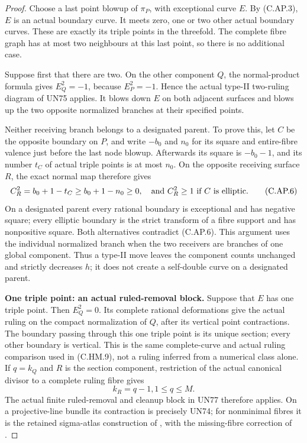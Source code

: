 \begin{proof}
Choose a last point blowup of \(\pi_P\), with exceptional
curve \(E\). By (C.AP.3), \(E\) is an actual boundary curve.
It meets zero, one or two other actual boundary curves.
These are exactly its triple points in the threefold.
The complete fibre graph has at most two neighbours at this
last point, so there is no additional case.

Suppose first that there are two. On the other component
\(Q\), the normal-product formula gives \(E_Q^2=-1\), because
\(E_P^2=-1\). Hence the actual type-II two-ruling diagram of
UN75 applies. It blows down \(E\) on both adjacent surfaces
and blows up the two opposite normalized branches at their
specified points.

Neither receiving branch belongs to a designated parent.
To prove this, let \(C\) be the opposite boundary on \(P\),
and write \(-b_0\) and \(n_0\) for its square and entire-fibre
valence just before the last node blowup. Afterwards its
square is \(-b_0-1\), and its number \(t_C\) of actual triple
points is at most \(n_0\). On the opposite receiving surface
\(R\), the exact normal map therefore gives
\[
 C_R^2=b_0+1-t_C\ge b_0+1-n_0\ge0,
 \quad\hbox{and } C_R^2\ge1\hbox{ if }C\hbox{ is elliptic}.
 \tag{C.AP.6}
\]
On a designated parent every rational boundary is exceptional
and has negative square; every elliptic boundary is the
strict transform of a fibre support and has nonpositive
square. Both alternatives contradict (C.AP.6). This argument
uses the individual normalized branch when the two receivers
are branches of one global component. Thus a type-II move
leaves the component counts unchanged and strictly decreases
\(h\); it does not create a self-double curve on a designated
parent.

\par\medskip\noindent\textbf{One triple point: an actual ruled-removal block.}
Suppose that \(E\) has one triple point. Then \(E_Q^2=0\).
Its complete rational deformations give the actual ruling
on the compact normalization of \(Q\), after its vertical
point contractions. The boundary passing through this one
triple point is its unique section; every other boundary is
vertical. This is the same complete-curve and actual ruling
comparison used in (C.HM.9), not a ruling inferred from a
numerical class alone. If \(q=k_Q\) and \(R\) is the section
component, restriction of the actual canonical divisor to
a complete ruling fibre gives
\[
                         k_R=q-1,
                         1\le q\le M.
 \tag{C.AP.7}
\]
The actual finite ruled-removal and cleanup block in UN77
therefore applies. On a projective-line bundle its contraction
is precisely UN74; for nonminimal fibres it is the retained
sigma-atlas construction of
\cite[\S\S4.10.7--4.10.9,4.14]{Kulikov1977}, with the
missing-fibre correction of \cite[\S8]{Kulikov1981}.


\end{proof}
